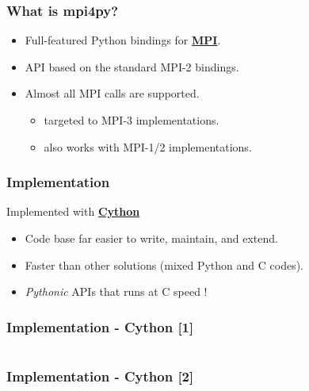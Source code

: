 \begin{frame}
  \frametitle{What is \textbf{mpi4py}?}
  \begin{itemize}
  \item Full-featured Python bindings for
    \href{http://www.mpi-forum.org}{\textbf{MPI}}.
  \item API based on the standard MPI-2 \Cpp bindings.
  \item Almost all MPI calls are supported.
    \begin{itemize}
    \item targeted to MPI-3 implementations.
    \item also works with MPI-1/2 implementations.
    \end{itemize}
  \end{itemize}
\end{frame}

\begin{frame}
  \frametitle{Implementation}
  Implemented with \href{http://www.cython.org}{\textbf{Cython}}
  \begin{itemize}
  \item Code base far easier to write, maintain, and extend.
  \item Faster than other solutions (mixed Python and C codes).
  \item \textsl{Pythonic} APIs that runs at C speed !
  \end{itemize}
\end{frame}

\begin{frame}
  \frametitle{Implementation - Cython [1]}
  \footnotesize
  \inputminted[firstline=1]{cython}{cython-mpi4py.pxi}
\end{frame}

\begin{frame}
  \frametitle{Implementation - Cython [2]}
  \footnotesize
  \inputminted[firstline=3]{cython}{cython-mpi4py.pyx}
\end{frame}

